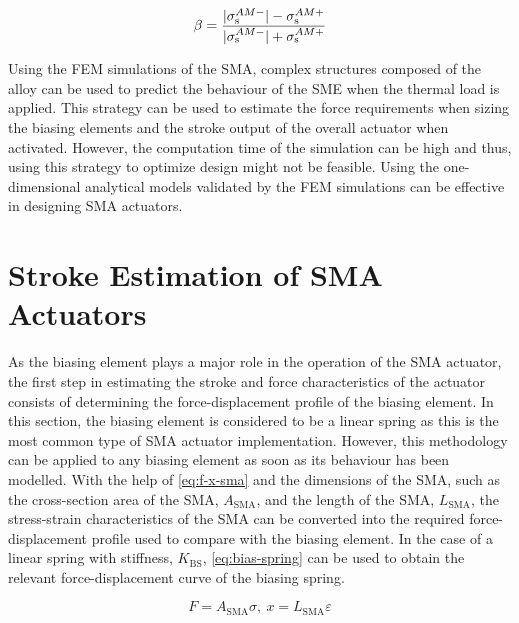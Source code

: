 \begin{equation}
    \label{eq:fem-beta}
    \beta = \frac{|\sigma_\mathrm{s}^{AM-}|-\sigma_\mathrm{s}^{AM+}}{|\sigma_\mathrm{s}^{AM-}|+\sigma_\mathrm{s}^{AM+}}
\end{equation}

Using the FEM simulations of the SMA, complex structures composed of the alloy can be used to predict the behaviour of the SME when the thermal load is applied. This strategy can be used to estimate the force requirements when sizing the biasing elements and the stroke output of the overall actuator when activated. However, the computation time of the simulation can be high and thus, using this strategy to optimize design might not be feasible. Using the one-dimensional analytical models validated by the FEM simulations can be effective in designing SMA actuators.

\section{Stroke Estimation of SMA Actuators}\label{sec:stroke-estimation}
As the biasing element plays a major role in the operation of the SMA actuator, the first step in estimating the stroke and force characteristics of the actuator consists of determining the force-displacement profile of the biasing element. In this section, the biasing element is considered to be a linear spring as this is the most common type of SMA actuator implementation. However, this methodology can be applied to any biasing element as soon as its behaviour has been modelled. With the help of \cref{eq:f-x-sma} and the dimensions of the SMA, such as the cross-section area of the SMA, $A_\mathrm{SMA}$, and the length of the SMA, $L_\mathrm{SMA}$, the stress-strain characteristics of the SMA can be converted into the required force-displacement profile used to compare with the biasing element. In the case of a linear spring with stiffness, $K_\mathrm{BS}$, \cref{eq:bias-spring} can be used to obtain the relevant force-displacement curve of the biasing spring.

\begin{equation}
    \label{eq:f-x-sma}
    F = A_\mathrm{SMA}\sigma,~x = L_\mathrm{SMA}\varepsilon
\end{equation}

